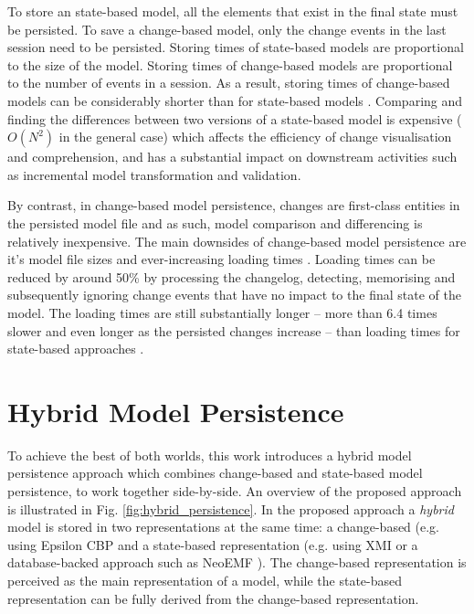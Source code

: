 To store an state-based model, all the elements that exist in the final state must be persisted. To save a change-based model, only the change events in the last session need to be persisted. Storing times of state-based models are proportional to the size of the model. Storing times of change-based models are proportional to the number of events in a session. As a result, storing times of change-based models can be considerably shorter than for state-based models \cite{yohannis2018towards}. Comparing and finding the differences between two versions of a state-based model is expensive \cite{Kolovos:2009:DMM:1564596.1564641} ($O(N^2)$ in the general case) which affects the efficiency of change visualisation and comprehension, and has a substantial impact on downstream activities such as incremental model transformation \cite{DBLP:conf/ecmdafa/OgunyomiRK15} and validation.

By contrast, in change-based model persistence, changes are first-class entities in the persisted model file and as such, model comparison and differencing is relatively inexpensive. The main downsides of change-based model persistence are it's model file sizes \cite{DBLP:journals/entcs/RobbesL07,DBLP:conf/edoc/KoegelHLHD10} and ever-increasing loading times \cite{mens2002state}. Loading times can be reduced by around 50\% by processing the changelog, detecting, memorising and subsequently ignoring change events that have no impact to the final state of the model. The loading times are still substantially longer -- more than 6.4 times slower and even longer as the persisted changes increase -- than loading times for state-based approaches \cite{yohannis2018towards}. 

\section{Hybrid Model Persistence}
\label{sec:hybrid_model_persistence}
To achieve the best of both worlds, this work introduces a hybrid model persistence approach which combines change-based and state-based model persistence, to work together side-by-side. An overview of the proposed approach is illustrated in Fig. \ref{fig:hybrid_persistence}. In the proposed approach a \textit{hybrid} model is stored in two representations at the same time: a change-based (e.g. using Epsilon CBP \cite{epsilonlabs2019emfcbp} and a state-based representation (e.g. using XMI \cite{omg2018xmi} or a database-backed approach such as NeoEMF \cite{daniel2016neoemf}). The change-based representation is perceived as the main representation of a model, while the state-based representation can be fully derived from the change-based representation.

